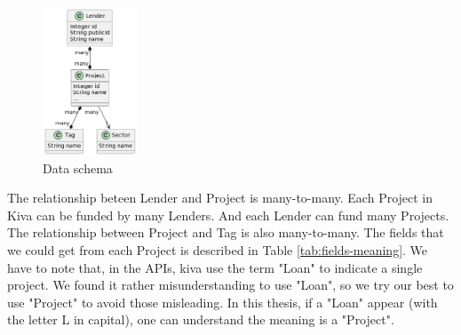 \begin{figure}[H]
	\centering
	\includegraphics[width=0.25\textwidth]{images/graphuml/dataschema.png}
	\caption{Data schema}
	\label{fig:data-schema}
\end{figure}

The relationship beteen Lender and Project is many-to-many.
Each Project in Kiva can be funded by many Lenders.
And each Lender can fund many Projects.
The relationship between Project and Tag is also many-to-many.
The fields that we could get from each Project is described in Table \ref{tab:fields-meaning}.
We have to note that, in the APIs, kiva use the term "Loan" to indicate a single project.
We found it rather misunderstanding to use "Loan", so we try our best to use "Project" to avoid those misleading.
In this thesis, if a "Loan" appear (with the letter L in capital), one can understand the meaning is a "Project".


